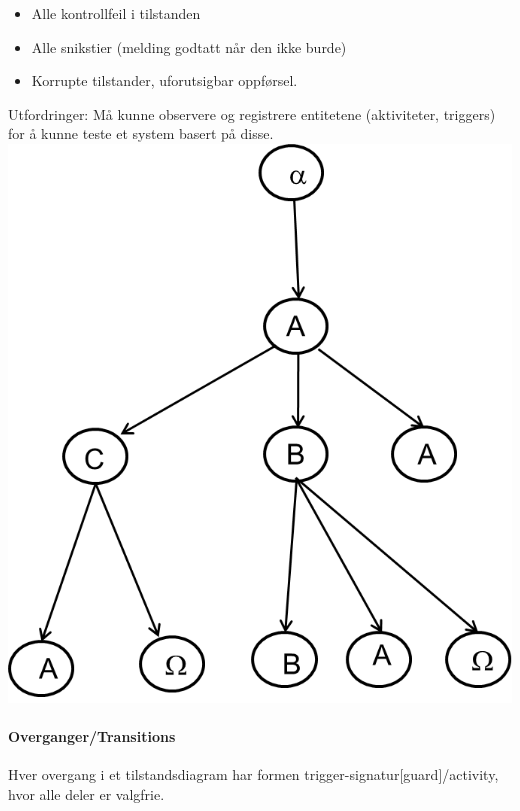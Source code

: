 \begin{itemize}
\item
  Alle kontrollfeil i tilstanden
\item
  Alle snikstier (melding godtatt når den ikke burde)
\item
  Korrupte tilstander, uforutsigbar oppførsel.
\end{itemize}
Utfordringer: Må kunne observere og registrere entitetene (aktiviteter,
triggers) for å kunne teste et system basert på disse.
\includegraphics{Forelesning 06/img/3.png}

\paragraph{Overganger/Transitions}

Hver overgang i et tilstandsdiagram har formen
trigger-signatur{[}guard{]}/activity, hvor alle deler er valgfrie.

